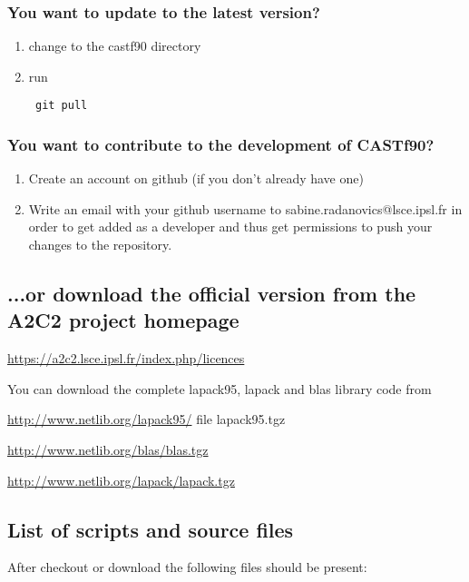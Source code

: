 \documentclass[11p,a4paper]{article}
\begin{document}
\subsubsection{You want to update to the latest version?}
\begin{enumerate}
\item change to the castf90 directory
\item run
\begin{verbatim}
 git pull
\end{verbatim}
\end{enumerate}
\subsubsection{You want to contribute to the development of CASTf90?}
\begin{enumerate}
 \item Create an account on github (if you don't already have one)
 \item Write an email with your github username to sabine.radanovics@lsce.ipsl.fr in order to get added as a developer and thus get permissions to push your changes to the repository.
\end{enumerate}

\subsection{...or download the official version from the A2C2 project homepage}

\href{https://a2c2.lsce.ipsl.fr/index.php/licences}{https://a2c2.lsce.ipsl.fr/index.php/licences}

You can download the complete lapack95, lapack and blas library code from 

\href{http://www.netlib.org/lapack95/}{http://www.netlib.org/lapack95/} file lapack95.tgz

\href{http://www.netlib.org/blas/blas.tgz}{http://www.netlib.org/blas/blas.tgz} 

\href{http://www.netlib.org/lapack/lapack.tgz}{http://www.netlib.org/lapack/lapack.tgz}

\subsection{List of scripts and source files}
\label{sec:listoffiles}
After checkout or download the following files should be present:
\end{document}

